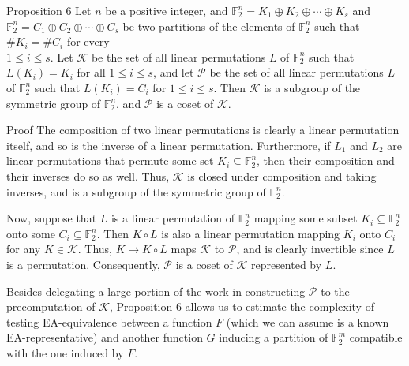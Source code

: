\documentclass[10pt]{article}
\begin{document}
Proposition 6 Let $n$ be a positive integer, and $\mathbb{F}_{2}^{n}=K_{1} \oplus K_{2} \oplus \cdots \oplus K_{s}$ and $\mathbb{F}_{2}^{n}= C_{1} \oplus C_{2} \oplus \cdots \oplus C_{s}$ be two partitions of the elements of $\mathbb{F}_{2}^{n}$ such that $\# K_{i}=\# C_{i}$ for every\\
$1 \leq i \leq s$. Let $\mathcal{K}$ be the set of all linear permutations $L$ of $\mathbb{F}_{2}^{n}$ such that $L\left(K_{i}\right)=K_{i}$ for all $1 \leq i \leq s$, and let $\mathcal{P}$ be the set of all linear permutations $L$ of $\mathbb{F}_{2}^{n}$ such that $L\left(K_{i}\right)=C_{i}$ for $1 \leq i \leq s$. Then $\mathcal{K}$ is a subgroup of the symmetric group of $\mathbb{F}_{2}^{n}$, and $\mathcal{P}$ is a coset of $\mathcal{K}$.

Proof The composition of two linear permutations is clearly a linear permutation itself, and so is the inverse of a linear permutation. Furthermore, if $L_{1}$ and $L_{2}$ are linear permutations that permute some set $K_{i} \subseteq \mathbb{F}_{2}^{n}$, then their composition and their inverses do so as well. Thus, $\mathcal{K}$ is closed under composition and taking inverses, and is a subgroup of the symmetric group of $\mathbb{F}_{2}^{n}$.

Now, suppose that $L$ is a linear permutation of $\mathbb{F}_{2}^{n}$ mapping some subset $K_{i} \subseteq \mathbb{F}_{2}^{n}$ onto some $C_{i} \subseteq \mathbb{F}_{2}^{n}$. Then $K \circ L$ is also a linear permutation mapping $K_{i}$ onto $C_{i}$ for any $K \in \mathcal{K}$. Thus, $K \mapsto K \circ L$ maps $\mathcal{K}$ to $\mathcal{P}$, and is clearly invertible since $L$ is a permutation. Consequently, $\mathcal{P}$ is a coset of $\mathcal{K}$ represented by $L$.

Besides delegating a large portion of the work in constructing $\mathcal{P}$ to the precomputation of $\mathcal{K}$, Proposition 6 allows us to estimate the complexity of testing EA-equivalence between a function $F$ (which we can assume is a known EA-representative) and another function $G$ inducing a partition of $\mathbb{F}_{2}^{m}$ compatible with the one induced by $F$.
\end{document}
